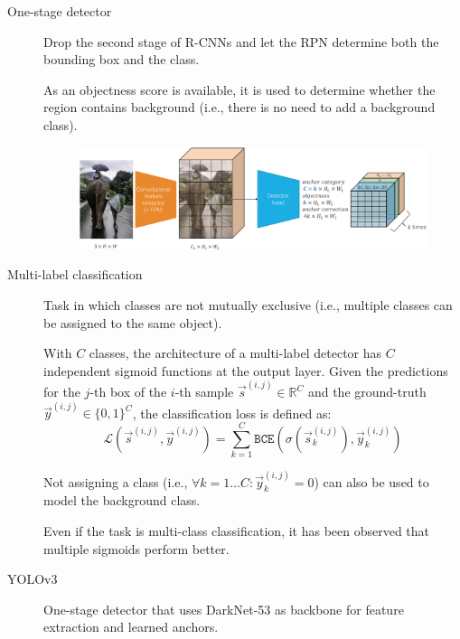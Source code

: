\begin{description}
    \item[One-stage detector] 
        Drop the second stage of R-CNNs and let the RPN determine both the bounding box and the class.

        As an objectness score is available, it is used to determine whether the region contains background (i.e., there is no need to add a background class).

        \begin{figure}[H]
            \centering
            \includegraphics[width=0.95\linewidth]{./img/_one_stage_detector.pdf}
        \end{figure}

    \item[Multi-label classification] 
        Task in which classes are not mutually exclusive (i.e., multiple classes can be assigned to the same object).

        With $C$ classes, the architecture of a multi-label detector has $C$ independent sigmoid functions at the output layer. Given the predictions for the $j$-th box of the $i$-th sample $\vec{s}^{(i, j)} \in \mathbb{R}^{C}$ and the ground-truth $\vec{y}^{(i, j)} \in \{0, 1\}^{C}$, the classification loss is defined as:
        \[ 
            \mathcal{L}(\vec{s}^{(i, j)}, \vec{y}^{(i, j)}) = \sum_{k=1}^{C} \texttt{BCE}\left( \sigma(\vec{s}_k^{(i, j)}), \vec{y}_k^{(i, j)} \right)
        \]

        \begin{remark}
            Not assigning a class (i.e., $\forall k = 1 \dots C: \vec{y}_k^{(i, j)} = 0$) can also be used to model the background class.
        \end{remark}

        \begin{remark}
            Even if the task is multi-class classification, it has been observed that multiple sigmoids perform better.
        \end{remark}

    \item[YOLOv3] 
        One-stage detector that uses DarkNet-53 as backbone for feature extraction and learned anchors.


\end{description}
